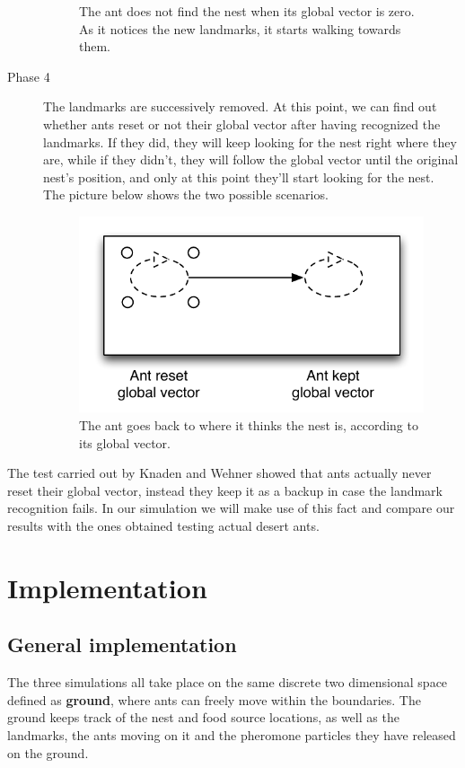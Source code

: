 \documentclass[11pt]{article}
\begin{document}
\begin{description}
\begin{figure}[h!]
     \caption{The ant does not find the nest when its global vector is zero. As it notices the new landmarks, it starts walking towards them.}
\end{figure}
\item[Phase 4] The landmarks are successively removed. At this point, we can find out whether ants reset or not their global vector after having recognized the landmarks. If they did, they will keep looking for the nest right where they are, while if they didn't, they will follow the global vector until the original nest's position, and only at this point they'll start looking for the nest. The picture below shows the two possible scenarios.
\begin{figure}[h!]
  \centering
    \includegraphics[width=.6\textwidth]{images/phase4}
     \caption{The ant goes back to where it thinks the nest is, according to its global vector.}
\end{figure}
\end{description}

The test carried out by Knaden and Wehner showed that ants actually never reset their global vector, instead they keep it as a backup in case the landmark recognition fails. In our simulation we will make use of this fact and compare our results with the ones obtained testing actual desert ants.

\section{Implementation}

\subsection{General implementation}
The three simulations all take place on the same discrete two dimensional space defined as \textbf{ground}, where ants can freely move within the boundaries. The ground keeps track of the nest and food source locations, as well as the landmarks, the ants moving on it and the pheromone particles they have released on the ground.
\end{document}
